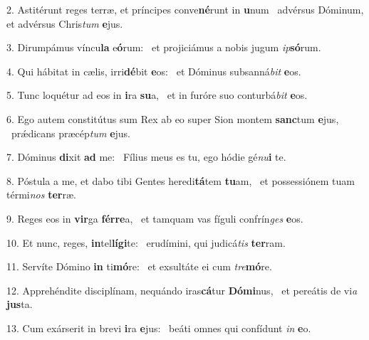 2. Astitérunt reges terræ, et príncipes conve\textbf{né}runt in \textbf{u}num \ast\  advérsus Dóminum, et advérsus Chris\textit{tum} \textbf{e}jus.\

3. Dirumpámus víncu\textbf{la} e\textbf{ó}rum: \ast\  et projiciámus a nobis jugum \textit{ip}\textbf{só}rum.\

4. Qui hábitat in cælis, irri\textbf{dé}bit \textbf{e}os: \ast\  et Dóminus subsanná\textit{bit} \textbf{e}os.\

5. Tunc loquétur ad eos in \textbf{i}ra \textbf{su}a, \ast\  et in furóre suo conturbá\textit{bit} \textbf{e}os.\

6. Ego autem constitútus sum Rex ab eo super Sion montem \textbf{sanc}tum \textbf{e}jus, \ast\  prǽdicans præcép\textit{tum} \textbf{e}jus.\

7. Dóminus \textbf{di}xit \textbf{ad} me: \ast\  Fílius meus es tu, ego hódie gé\textit{nu}\textbf{i} te.\

8. Póstula a me, et dabo tibi Gentes heredi\textbf{tá}tem \textbf{tu}am, \ast\  et possessiónem tuam térmi\textit{nos} \textbf{ter}ræ.\

9. Reges eos in \textbf{vir}ga \textbf{fér}\textbf{re}a, \ast\  et tamquam vas fíguli confrín\textit{ges} \textbf{e}os.\

10. Et nunc, reges, \textbf{in}tel\textbf{lí}\textbf{gi}te: \ast\  erudímini, qui judicá\textit{tis} \textbf{ter}ram.\

11. Servíte Dómino \textbf{in} ti\textbf{mó}re: \ast\  et exsultáte ei cum \textit{tre}\textbf{mó}re.\

12. Apprehéndite disciplínam, nequándo iras\textbf{cá}tur \textbf{Dó}\textbf{mi}nus, \ast\  et pereátis de vi\textit{a} \textbf{jus}ta.\

13. Cum exárserit in brevi \textbf{i}ra \textbf{e}jus: \ast\  beáti omnes qui confídunt \textit{in} \textbf{e}o.\

